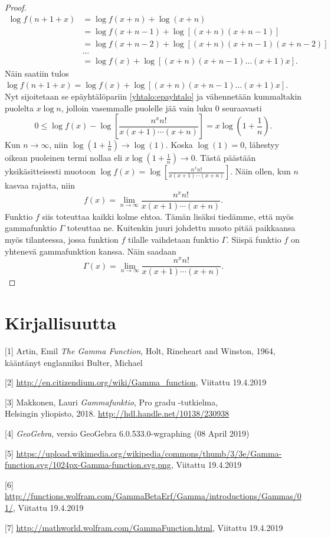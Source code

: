 \documentclass[12pt]{article}
\theoremstyle{definition}
\theoremstyle{plain}
\numberwithin{equation}{section}
\begin{document}
\begin{proof}
\begin{align*}
    \log f(n+1+x) & = \log f(x+n) + \log (x+n) \\
    & = \log f(x+n-1) + \log [(x+n)(x+n-1)] \\
    & = \log f(x+n-2)+\log [(x+n)(x+n-1)(x+n-2)] \\
    & \dots \\
    & = \log f(x) + \log [(x+n)(x+n-1)\dots(x+1)x].
\end{align*}
Näin saatiin tulos $\log f(n+1+x) = \log f(x) + \log [(x+n)(x+n-1)\dots(x+1)x]$. Nyt sijoitetaan se epäyhtälöpariin \eqref{yhtalo:epayhtalo} ja vähennetään kummaltakin puolelta $x\log n$, jolloin vasemmalle puolelle jää vain luku $0$ seuraavasti
\begin{equation*}
    0 \le \log f(x) -\log \left[ \frac{n^xn!}{x(x+1)\cdots(x+n)}\right] = x\log \left(1+\frac{1}{n}\right).
\end{equation*}
Kun $n\rightarrow\infty$, niin $\log (1+\frac{1}{n})\rightarrow \log (1)$. Koska $\log (1)=0$, lähestyy oikean puoleinen termi nollaa eli $x\log (1+\frac{1}{n})\rightarrow 0$. Tästä päästään yksikäsitteisesti muotoon  $\log f(x) = \log \left[\frac{n^xn!}{x(x+1)\cdots(x+n)}\right]$. Näin ollen, kun $n$ kasvaa rajatta, niin
\begin{equation*}
    f(x)=\lim_{n\to\infty} \frac{n^xn!}{x(x+1)\cdots(x+n)}.
\end{equation*}
Funktio $f$ siis toteuttaa kaikki kolme ehtoa. Tämän lisäksi tiedämme, että myös gammafunktio $\Gamma$ toteuttaa ne. Kuitenkin juuri johdettu muoto pitää paikkaansa myös tilanteessa, jossa funktion $f$ tilalle vaihdetaan funktio $\Gamma$. Siispä funktio $f$ on yhtenevä gammafunktion kanssa. Näin saadaan
\begin{equation*}
    \Gamma(x) = \lim_{n\to\infty}\frac{n^xn!}{x(x+1)\cdots(x+n)}.
\end{equation*}

\end{proof}

\newpage
\doublespacing
\section{Kirjallisuutta}
[1] Artin, Emil \emph{The Gamma Function}, Holt, Rineheart and Winston, 1964, kääntänyt englanniksi Bulter, Michael

[2] \url{http://en.citizendium.org/wiki/Gamma_function}, Viitattu 19.4.2019

[3] Makkonen, Lauri \emph{Gammafunktio}, Pro gradu -tutkielma,\\ Helsingin yliopisto, 2018. \url{http://hdl.handle.net/10138/230938}

[4] \emph{GeoGebra}, versio GeoGebra 6.0.533.0-wgraphing (08 April 2019)

[5] \url{https://upload.wikimedia.org/wikipedia/commons/thumb/3/3e/Gamma-function.svg/1024px-Gamma-function.svg.png}, Viitattu 19.4.2019

[6] \url{http://functions.wolfram.com/GammaBetaErf/Gamma/introductions/Gammas/01/}, Viitattu 19.4.2019

[7] \url{http://mathworld.wolfram.com/GammaFunction.html}, Viitattu 19.4.2019
\end{document}
